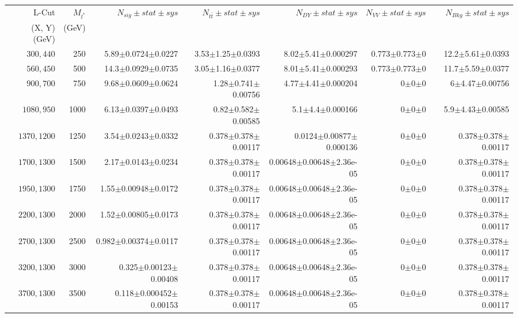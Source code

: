 \documentclass[]{article}
\begin{document}
\begin{table}
\begin{center}
\scriptsize{
\begin{tabular}{ |r|r|r|r|r|r|r|}
\hline 
L-Cut & $M_{l^*}$ & $N_{sig}\pm stat \pm sys $ &$N_{t\bar{t}}\pm stat \pm sys $ & $N_{DY}\pm stat \pm sys $ & $N_{VV}\pm stat \pm sys $ &$N_{Bkg}\pm stat \pm sys$\\
 (X, Y) (GeV) & (GeV) & && &&\\
\hline 
$300, 440$ & 250 & 5.89$\pm$0.0724$\pm$0.0227 & 3.53$\pm$1.25$\pm$0.0393 & 8.02$\pm$5.41$\pm$0.000297 & 0.773$\pm$0.773$\pm$0 & 12.2$\pm$5.61$\pm$0.0393 \\
$560, 450$ & 500 & 14.3$\pm$0.0929$\pm$0.0735 & 3.05$\pm$1.16$\pm$0.0377 & 8.01$\pm$5.41$\pm$0.000293 & 0.773$\pm$0.773$\pm$0 & 11.7$\pm$5.59$\pm$0.0377 \\
$900, 700$ & 750 & 9.68$\pm$0.0609$\pm$0.0624 & 1.28$\pm$0.741$\pm$0.00756 & 4.77$\pm$4.41$\pm$0.000204 & 0$\pm$0$\pm$0 & 6$\pm$4.47$\pm$0.00756 \\
$1080,950$ & 1000 & 6.13$\pm$0.0397$\pm$0.0493 & 0.82$\pm$0.582$\pm$0.00585 & 5.1$\pm$4.4$\pm$0.000166 & 0$\pm$0$\pm$0 & 5.9$\pm$4.43$\pm$0.00585 \\
$1370,1200$ & 1250 & 3.54$\pm$0.0243$\pm$0.0332 & 0.378$\pm$0.378$\pm$0.00117 & 0.0124$\pm$0.00877$\pm$0.000136 & 0$\pm$0$\pm$0 & 0.378$\pm$0.378$\pm$0.00117 \\
$1700,1300$ & 1500 & 2.17$\pm$0.0143$\pm$0.0234 & 0.378$\pm$0.378$\pm$0.00117 & 0.00648$\pm$0.00648$\pm$2.36e-05 & 0$\pm$0$\pm$0 & 0.378$\pm$0.378$\pm$0.00117 \\
$1950,1300$ & 1750 & 1.55$\pm$0.00948$\pm$0.0172 & 0.378$\pm$0.378$\pm$0.00117 & 0.00648$\pm$0.00648$\pm$2.36e-05 & 0$\pm$0$\pm$0 & 0.378$\pm$0.378$\pm$0.00117 \\
$2200,1300$ & 2000 & 1.52$\pm$0.00805$\pm$0.0173 & 0.378$\pm$0.378$\pm$0.00117 & 0.00648$\pm$0.00648$\pm$2.36e-05 & 0$\pm$0$\pm$0 & 0.378$\pm$0.378$\pm$0.00117 \\
$2700,1300$ & 2500 & 0.982$\pm$0.00374$\pm$0.0117 & 0.378$\pm$0.378$\pm$0.00117 & 0.00648$\pm$0.00648$\pm$2.36e-05 & 0$\pm$0$\pm$0 & 0.378$\pm$0.378$\pm$0.00117 \\
$3200,1300$ & 3000 & 0.325$\pm$0.00123$\pm$0.00408 & 0.378$\pm$0.378$\pm$0.00117 & 0.00648$\pm$0.00648$\pm$2.36e-05 & 0$\pm$0$\pm$0 & 0.378$\pm$0.378$\pm$0.00117 \\
$3700,1300$ & 3500 & 0.118$\pm$0.000452$\pm$0.00153 & 0.378$\pm$0.378$\pm$0.00117 & 0.00648$\pm$0.00648$\pm$2.36e-05 & 0$\pm$0$\pm$0 & 0.378$\pm$0.378$\pm$0.00117 \\

\end{tabular}}
\end{center}
\end{table}
\end{document}
